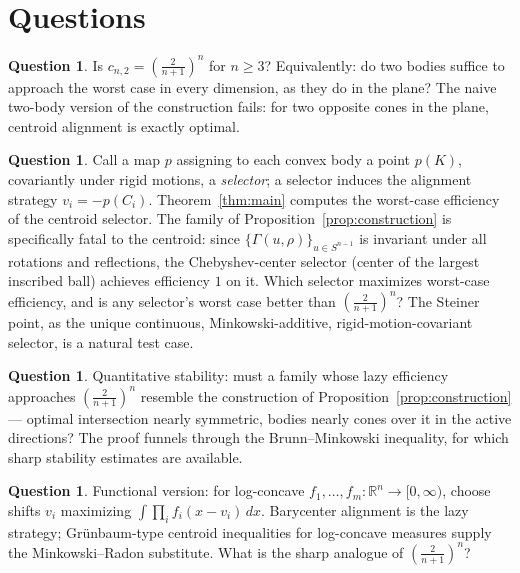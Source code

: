 \documentclass[12pt]{article}
\theoremstyle{definition}
\newtheorem{question}[theorem]{Question}
\newcommand{\R}{\mathbb{R}}
\newcommand{\Sph}{S^{n-1}}
\begin{document}
\section{Questions}\label{sec:questions}

\begin{question}\label{q:twobody}
Is $c_{n,2}=\left(\frac{2}{n+1}\right)^n$ for $n\ge 3$?  Equivalently:
do two bodies suffice to approach the worst case in every dimension, as
they do in the plane?  The naive two-body version of the construction fails:
for two opposite cones in the plane, centroid alignment is exactly optimal.
\end{question}

\begin{question}\label{q:selector}
Call a map $p$ assigning to each convex body a point $p(K)$, covariantly
under rigid motions, a {\em selector}; a selector induces the alignment
strategy $v_i=-p(C_i)$.  Theorem~\ref{thm:main} computes the worst-case
efficiency of the centroid selector.  The family of
Proposition~\ref{prop:construction} is specifically fatal to the centroid:
since $\{\Gamma(u,\rho)\}_{u\in\Sph}$ is invariant under all rotations and
reflections, the Chebyshev-center selector (center of the largest inscribed
ball) achieves efficiency $1$ on it.  Which selector maximizes
worst-case efficiency, and is any selector's worst case better than
$\left(\frac{2}{n+1}\right)^n$?  The Steiner point, as the unique
continuous, Minkowski-additive, rigid-motion-covariant selector, is a
natural test case.
\end{question}

\begin{question}
Quantitative stability: must a family whose lazy efficiency approaches
$\left(\frac{2}{n+1}\right)^n$ resemble the construction of
Proposition~\ref{prop:construction} --- optimal intersection nearly
symmetric, bodies nearly cones over it in the active directions?  The proof funnels through the
Brunn--Minkowski inequality, for which sharp stability estimates are
available.
\end{question}

\begin{question}
Functional version: for log-concave $f_1,\ldots,f_m:\R^n\to[0,\infty)$,
choose shifts $v_i$ maximizing $\int\prod_i f_i(x-v_i)\,dx$.  Barycenter
alignment is the lazy strategy; Gr\"unbaum-type centroid inequalities
for log-concave measures supply the Minkowski--Radon substitute.  What
is the sharp analogue of $\left(\frac{2}{n+1}\right)^n$?
\end{question}
\end{document}
